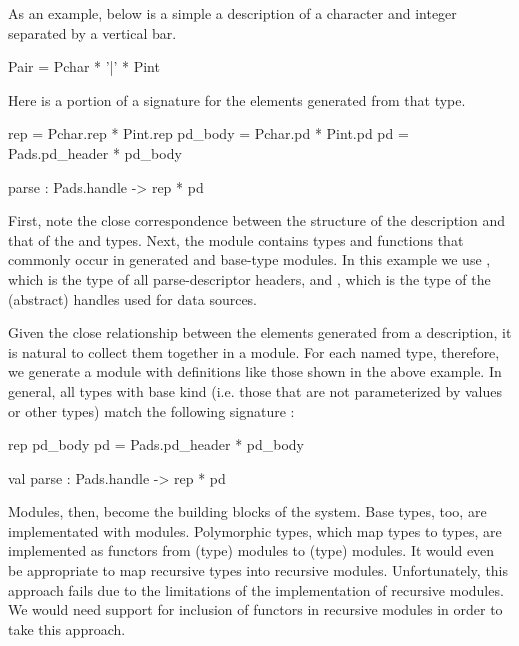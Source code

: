 As an example, below is a simple a \padsml{} description of a character
and integer separated by a vertical bar.
\begin{code}\scriptsize
{} Pair = Pchar * '|' * Pint\end{code}
Here is a portion of a signature for the elements generated from that
type. 
\begin{code}
 rep = Pchar.rep * Pint.rep
 pd_body = Pchar.pd  * Pint.pd
 pd = Pads.pd_header * pd_body

 parse : Pads.handle -> rep * pd\end{code} 

First, note the close correspondence between the structure of the
description and that of the  and  types. Next, the
 module contains types and functions that commonly occur in
generated and base-type modules. In this example we use
, which is the type of all parse-descriptor
headers, and , which is the type of the (abstract)
handles used for data sources.

Given the close relationship between the elements generated from a
description, it is natural to collect them together in a module. For
each named type, therefore, we generate a module with definitions like
those shown in the above example.
In general, all types with base kind (i.e. those that are not
parameterized by values or other types) match the following signature
:
\begin{code}\scriptsize
{} rep
 pd\_body
 pd = Pads.pd_header * pd_body

val parse : Pads.handle -> rep * pd\end{code}

Modules, then, become the building blocks of the \padsml{} system.
Base types, too, are implementated with modules. Polymorphic types,
which map types to types, are implemented as functors from (type)
modules to (type) modules. It would even be appropriate to map
recursive types into recursive modules. Unfortunately, this approach
fails due to the limitations of the \ocaml{} implementation of
recursive modules. We would need support for inclusion of functors in
recursive modules in order to take this approach.

